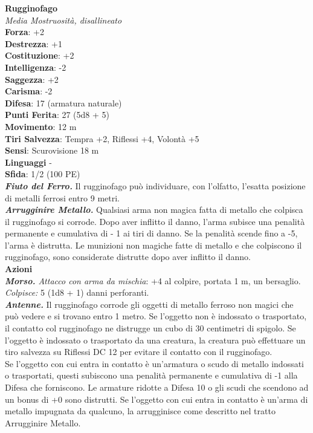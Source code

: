 \begin{multicols}{2}
\medskip\textbf{Rugginofago}\\
\emph{Media Mostruosità, disallineato}\\
\textbf{Forza}: +2\\
\textbf{Destrezza}: +1\\
\textbf{Costituzione}: +2\\
\textbf{Intelligenza}: -2\\
\textbf{Saggezza}: +2\\
\textbf{Carisma}: -2\\
\textbf{Difesa}: 17 (armatura naturale)\\
\textbf{Punti Ferita}: 27 (5d8 + 5)\\
\textbf{Movimento}: 12 m\\
\textbf{Tiri Salvezza}: Tempra +2, Riflessi +4, Volontà +5\\
\textbf{Sensi}: Scurovisione 18 m\\
\textbf{Linguaggi} -\\
\textbf{Sfida}: 1/2 (100 PE)\smallskip\\
\emph{\textbf{Fiuto del Ferro.}} Il rugginofago può individuare, con l'olfatto, l'esatta posizione di metalli ferrosi entro 9 metri.\\
\emph{\textbf{Arrugginire Metallo.}} Qualsiasi arma non magica fatta di metallo che colpisca il rugginofago si corrode. Dopo aver inflitto il danno, l'arma subisce una penalità permanente e cumulativa di - 1 ai tiri di danno. Se la penalità scende fino a -5, l'arma è distrutta. Le munizioni non magiche fatte di metallo e che colpiscono il rugginofago, sono considerate distrutte dopo aver inflitto il danno. \\
\smallskip\textbf{Azioni}\\
\emph{\textbf{Morso.} Attacco con arma da mischia}: +4 al colpire, portata 1 m, un bersaglio.
\emph{Colpisce:} 5 (1d8 + 1) danni perforanti.\\
\emph{\textbf{Antenne.}} Il rugginofago corrode gli oggetti di metallo ferroso non magici che può vedere e si trovano entro 1 metro. Se l'oggetto non è indossato o trasportato, il contatto col rugginofago ne distrugge un cubo di 30 centimetri di spigolo. Se l'oggetto è indossato o trasportato da una creatura, la creatura può effettuare un tiro salvezza su Riflessi DC  12 per evitare il contatto con il rugginofago. \\
Se l'oggetto con cui entra in contatto è un'armatura o scudo di metallo indossati o trasportati, questi subiscono una penalità permanente e cumulativa di -1 alla Difesa che forniscono. Le armature ridotte a Difesa 10 o gli scudi che scendono ad un bonus di +0 sono distrutti. Se l'oggetto con cui entra in contatto è un'arma di metallo impugnata da qualcuno, la arrugginisce come descritto nel tratto Arrugginire Metallo. 

\end{multicols}

